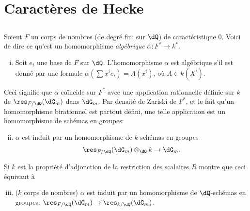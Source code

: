 \section{Caractères de Hecke}\label{VI:5}





\subsection{}\label{VI:5-1}

Soient $F$ un corps de nombres (de degré fini sur $\dQ$)  de 
caractéristique $0$. Voici  de dire ce qu'est un 
homomorphisme \emph{algébrique} $\alpha:F^\ast \to k^\ast$. 
\begin{enumerate}[(i)]
  \item Soit $e_i$ une base de $F$ sur $\dQ$. L'homomorphisme $\alpha$ est 
    algébrique s'il est donné par une formule 
    $\alpha(\sum x^i e_i) = A(x^i)$, où $A\in k(X^i)$. 
\end{enumerate}

Ceci signifie que $\alpha$ coïncide sur $F^\ast$ avec une application 
rationnelle définie sur $k$ de $\res_{F/\dQ}(\dG_m)$ dans $\dG_m$. Par 
densité de Zariski de $F^\ast$, et le fait qu'un homomorphisme birationnel 
est partout défini, une telle application est un homomorphisme de schémas 
en groupes: 
\begin{enumerate}[(i)]
\setcounter{enumi}{1}
  \item $\alpha$ est induit par un homomorphisme de $k$-schémas en groupes 
    \[
      \res_{F/\dQ}(\dG_m)\otimes_\dQ k \to \dG_m \text{.} 
    \] 
\end{enumerate}

Si $k$ est  la propriété d'adjonction de la restriction 
des scalaires $R$ montre que ceci équivaut à 
\begin{enumerate}[(i)]
\setcounter{enumi}{2}
  \item ($k$ corps de nombres) $\alpha$ est induit par un homomorphisme de 
    $\dQ$-schémas en groupes: $\res_{F/\dQ}(\dG_m) \to \res_{k/\dQ}(\dG_m)$. 
\end{enumerate}

